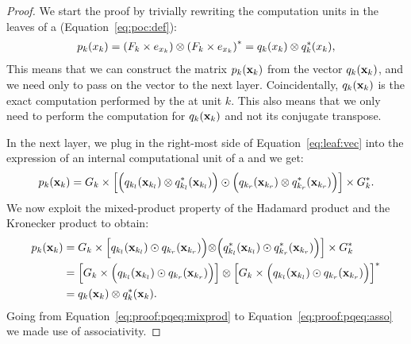 \begin{proof}
	We start the proof by trivially rewriting the computation units in the leaves of a \poc  (Equation~\ref{eq:poc:def}):
	\begin{align}
		p_k(x_k)
		=
		\left(F_{k} \times  e_{x_k} \right)
		\otimes
		\left(   F_{k}  \times  e_{x_k}\right)^*
		=
		q_k (x_k) \otimes q_k^* (x_k),
		\label{eq:leaf:vec}
	\end{align}
	This means that we can construct the matrix $p_k(\mathbf{x}_k)$ from the vector $q_k(\mathbf{x}_k)$, and we need only to pass on the vector to the next layer. Coincidentally, $q_k(\mathbf{x}_k)$ is the exact computation performed by the \pvc at unit $k$. This also means that we only need to perform the computation for $q_k(\mathbf{x}_k)$ and not its conjugate transpose.

	In the next layer, we plug in the right-most side of Equation~\ref{eq:leaf:vec} into the expression of an internal computational unit of a \poc and we get:
	\begin{align}
		p_k(\mathbf{x}_k)
		=
		G_k
		\times
		\Bigl[
			\Bigl(
			q_{k_l}(\mathbf{x}_{k_l})
			\otimes
			q^*_{k_l}(\mathbf{x}_{k_l})
			\Bigr)
			\odot
			\Bigl(
			q_{k_r}(\mathbf{x}_{k_r})
			\otimes
			q^*_{k_r}(\mathbf{x}_{k_r})
			\Bigr)
			\Bigr]
		\times
		G_{k}^*.
	\end{align}
	We now exploit the mixed-product property of the Hadamard product and the Kronecker product to obtain:
	\begin{align}
		p_k(\mathbf{x}_k)
		 &
		=
		G_k
		\times
		\Bigl[
			q_{k_l}(\mathbf{x}_{k_l})
			\odot
			q_{k_r}(\mathbf{x}_{k_r})
			\Bigl)
			\otimes
			\Bigl(
			q^*_{k_l}(\mathbf{x}_{k_l})
			\odot
			q^*_{k_r}(\mathbf{x}_{k_r})
			\Bigr)
			\Bigr]
		\times
		G_{k}^*
		\label{eq:proof:pqeq:mixprod}
		\\
		 &
		=
		\Bigl[
			G_k
			\times
			\Bigl(
			q_{k_l}(\mathbf{x}_{k_l})
			\odot
			q_{k_r}(\mathbf{x}_{k_r})
			\Bigr)
			\Bigr]
		\otimes
		\Bigl[
			G_k
			\times
			\Bigl(
			q_{k_l}(\mathbf{x}_{k_l})
			\odot
			q_{k_r}(\mathbf{x}_{k_r})
			\Bigr)
			\Bigr]^*
		\label{eq:proof:pqeq:asso}
		\\
		 &
		=
		q_k(\mathbf{x}_k) \otimes q^*_k(\mathbf{x}_k).
		\label{eq:proof:pqeq:krodeco}
	\end{align}
	Going from Equation~\ref{eq:proof:pqeq:mixprod} to Equation~\ref{eq:proof:pqeq:asso} we made use of associativity.


\end{proof}
